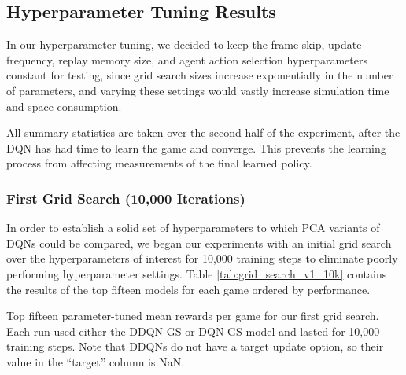 \documentclass[11pt]{article}
\newcommand{\cp}{\texttt{CartPole}}
\begin{document}



\subsection{Hyperparameter Tuning Results}

In our hyperparameter tuning, we decided to keep the frame skip, update frequency, replay memory size, and agent action selection hyperparameters constant for testing, since grid search sizes increase exponentially in the number of parameters, and varying these settings would vastly increase simulation time and space consumption. 

All summary statistics are taken over the second half of the experiment, after the DQN has had time to learn the game and converge. This prevents the learning process from affecting measurements of the final learned policy.

\subsubsection{First Grid Search (10,000 Iterations)}

In order to establish a solid set of hyperparameters to which PCA variants of DQNs could be compared, we began our experiments with an initial grid search over the hyperparameters of interest for 10,000 training steps to eliminate poorly performing hyperparameter settings. Table \ref{tab:grid_search_v1_10k} contains the results of the top fifteen models for each game ordered by performance.

\begin{table}[!ht]
    \footnotesize
    \centering
    
    
    \caption{Top fifteen parameter-tuned mean rewards per game for our first grid search. Each run used either the DDQN-GS or DQN-GS model and lasted for 10,000 training steps. Note that DDQNs do not have a target update option, so their value in the ``target'' column is NaN.}
    \label{tab:grid_search_v1_10k}
\end{table}
\end{document}

